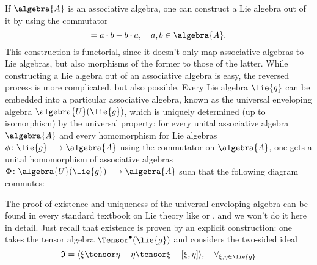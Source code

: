 If $\algebra{A}$ is an associative algebra, one can construct a Lie algebra 
out of it by using the commutator
\begin{equation*}
	[a,b]
	=
	a \cdot b - b \cdot a
	, \quad
	a,b \in \algebra{A}.
\end{equation*}
This construction is functorial, since it doesn't only map associative 
algebras to Lie algebras, but also morphisms of the former to those of the 
latter. While constructing a Lie algebra out of an associative algebra is easy, 
the reversed process is more complicated, but also possible. Every Lie algebra 
$\lie{g}$ can be embedded into a particular associative algebra, known as 
the universal enveloping algebra $\algebra{U}(\lie{g})$, which
is uniquely determined (up to isomorphism) by the universal property: for 
every unital associative algebra $\algebra{A}$ and every homomorphism for Lie 
algebras $\phi\colon \lie{g} \longrightarrow \algebra{A}$ using the 
commutator on $\algebra{A}$, one gets a unital homomorphism of associative 
algebras $\Phi \colon \algebra{U}(\lie{g}) \longrightarrow \algebra{A}$ such 
that the following diagram commutes:
\begin{center}
\end{center}
The proof of existence and uniqueness of the universal enveloping algebra can 
be found in every standard textbook on Lie theory like 
\cite{hilgert.neeb:2012a} or \cite{varadarajan:1974a}, and we won't do it here 
in detail. Just recall that existence is proven by an explicit construction: 
one takes the tensor algebra $\Tensor^{\bullet}(\lie{g})$ and considers the 
two-sided ideal
\begin{equation*}
	\mathfrak{I}
	=
	\langle \xi \tensor \eta - \eta \tensor \xi - [\xi, \eta] \rangle
	, \quad
	\forall_{\xi, \eta \in \lie{g}}
\end{equation*}
